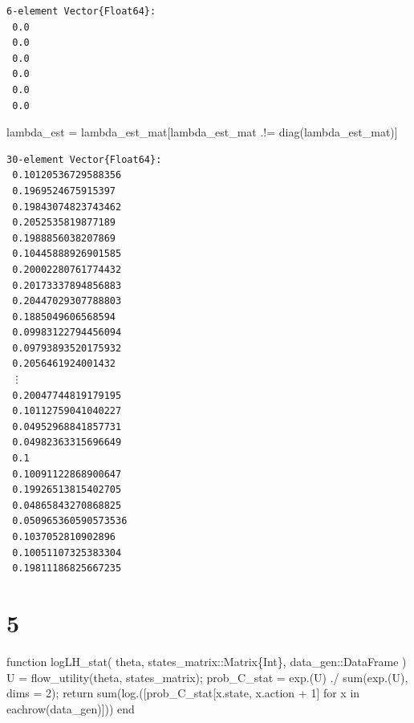 \documentclass[
  letterpaper,
  DIV=11,
  numbers=noendperiod]{scrreprt}
\newenvironment{Shaded}{\begin{snugshade}}{\end{snugshade}}
\newcommand{\ControlFlowTok}[1]{\textcolor[rgb]{0.00,0.23,0.31}{#1}}
\newcommand{\DataTypeTok}[1]{\textcolor[rgb]{0.68,0.00,0.00}{#1}}
\newcommand{\FloatTok}[1]{\textcolor[rgb]{0.68,0.00,0.00}{#1}}
\newcommand{\FunctionTok}[1]{\textcolor[rgb]{0.28,0.35,0.67}{#1}}
\newcommand{\KeywordTok}[1]{\textcolor[rgb]{0.00,0.23,0.31}{#1}}
\newcommand{\NormalTok}[1]{\textcolor[rgb]{0.00,0.23,0.31}{#1}}
\newcommand{\OperatorTok}[1]{\textcolor[rgb]{0.37,0.37,0.37}{#1}}
\begin{document}
\begin{verbatim}
6-element Vector{Float64}:
 0.0
 0.0
 0.0
 0.0
 0.0
 0.0
\end{verbatim}

\begin{Shaded}
\begin{Highlighting}[]
\NormalTok{lambda\_est }\OperatorTok{=}\NormalTok{ lambda\_est\_mat}\OperatorTok{\textquotesingle{}}\NormalTok{[lambda\_est\_mat}\OperatorTok{\textquotesingle{}} \OperatorTok{.!=} \FunctionTok{diag}\NormalTok{(lambda\_est\_mat)]}
\end{Highlighting}
\end{Shaded}

\begin{verbatim}
30-element Vector{Float64}:
 0.10120536729588356
 0.1969524675915397
 0.19843074823743462
 0.2052535819877189
 0.1988856038207869
 0.10445888926901585
 0.20002280761774432
 0.20173337894856883
 0.20447029307788803
 0.1885049606568594
 0.09983122794456094
 0.09793893520175932
 0.2056461924001432
 ⋮
 0.20047744819179195
 0.10112759041040227
 0.04952968841857731
 0.04982363315696649
 0.1
 0.10091122868900647
 0.19926513815402705
 0.04865843270868825
 0.050965360590573536
 0.1037052810902896
 0.10051107325383304
 0.19811186825667235
\end{verbatim}

\hypertarget{section-28}{%
\section{5}\label{section-28}}

\begin{Shaded}
\begin{Highlighting}[]
\KeywordTok{function} \FunctionTok{logLH\_stat}\NormalTok{(}
\NormalTok{    theta,}
\NormalTok{    states\_matrix}\OperatorTok{::}\DataTypeTok{Matrix\{Int\}}\NormalTok{,}
\NormalTok{    data\_gen}\OperatorTok{::}\DataTypeTok{DataFrame}
\NormalTok{)}
\NormalTok{    U }\OperatorTok{=} \FunctionTok{flow\_utility}\NormalTok{(theta, states\_matrix);}
\NormalTok{    prob\_C\_stat }\OperatorTok{=} \FunctionTok{exp}\NormalTok{.(U) }\OperatorTok{./} \FunctionTok{sum}\NormalTok{(}\FunctionTok{exp}\NormalTok{.(U), dims }\OperatorTok{=} \FloatTok{2}\NormalTok{);}
    \ControlFlowTok{return} \FunctionTok{sum}\NormalTok{(}\FunctionTok{log}\NormalTok{.([prob\_C\_stat[x.state, x.action }\OperatorTok{+} \FloatTok{1}\NormalTok{] for x }\KeywordTok{in} \FunctionTok{eachrow}\NormalTok{(data\_gen)]))}
\KeywordTok{end}
\end{Highlighting}
\end{Shaded}
\end{document}
